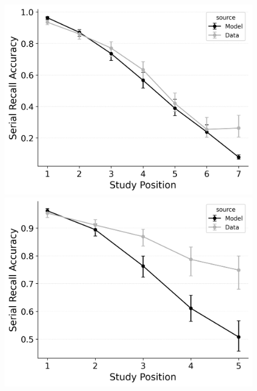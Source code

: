 \documentclass[
  man,
  floatsintext,
  longtable,
  nolmodern,
  notxfonts,
  notimes,
  draftfirst,
  colorlinks=true,linkcolor=blue,citecolor=blue,urlcolor=blue]{apa7}
\begin{document}
\begin{figure}
%
\begin{minipage}{0.33\linewidth}
\includegraphics{figures/bw_Gordon2021_BaseCRU_Confusable_Fitting_srac_LL7.png}\end{minipage}%
\newline
\begin{minipage}{0.33\linewidth}
\includegraphics{figures/bw_Gordon2021_CRU_with_Pre-Expt_and_Primacy_Confusable_Fitting_srac_LL5.png}\end{minipage}%
%
\begin{minipage}{0.33\linewidth}

\end{minipage}
\end{figure}
\end{document}
